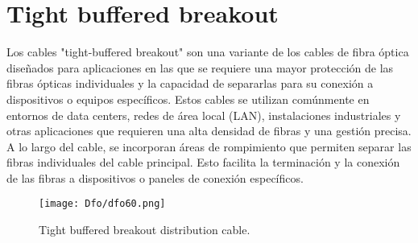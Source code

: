\documentclass[
	12pt, %
	fleqn, %
	a4paper, %
	oneside, %
]{LegrandOrangeBook}
\begin{document}
\section{Tight buffered breakout}
Los cables "tight-buffered breakout" son una variante de los cables de fibra óptica diseñados para aplicaciones en las que se requiere una mayor protección de las fibras ópticas individuales y la capacidad de separarlas para su conexión a dispositivos o equipos específicos. Estos cables se utilizan comúnmente en entornos de data centers, redes de área local (LAN), instalaciones industriales y otras aplicaciones que requieren una alta densidad de fibras y una gestión precisa. A lo largo del cable, se incorporan áreas de rompimiento que permiten separar las fibras individuales del cable principal. Esto facilita la terminación y la conexión de las fibras a dispositivos o paneles de conexión específicos.
\begin{figure}[H]
\centering
\texttt{[image: Dfo/dfo60.png]}
\caption{Tight buffered breakout distribution cable.}
\end{figure}
\end{document}
